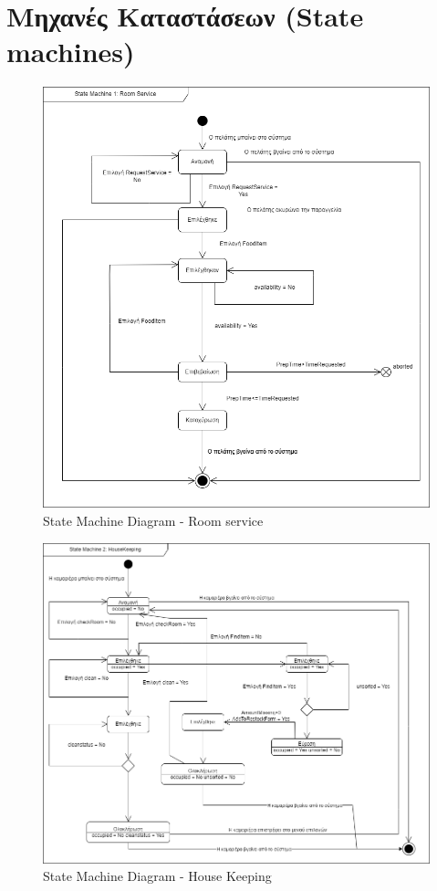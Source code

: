 \section{Μηχανές Καταστάσεων (State machines)}
\begin{figure}[H]
	\centering
	\includegraphics[width=1\textwidth]{Images/State_Machine-Room service}
	\caption{State Machine Diagram - Room service}
\end{figure}

\begin{figure}[H]
	\centering
	\includegraphics[width=1\textwidth]{Images/State_Machine-HouseKeeping}
	\caption{State Machine Diagram - House Keeping}
\end{figure}
